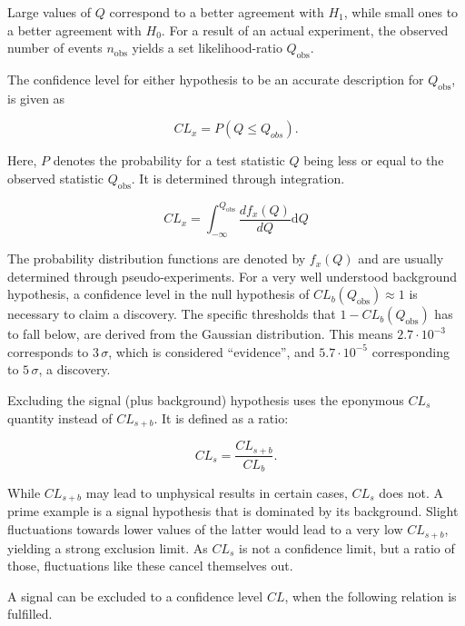 \noindent Large values of $Q$ correspond to a better agreement with $H_1$, while small ones to a better agreement with $H_0$. For a result of an actual experiment, the observed number of events $n_{\text{obs}}$ yields a set likelihood-ratio $Q_{\text{obs}}$.

The confidence level for either hypothesis to be an accurate description for $Q_{\text{obs}}$, is given as

\begin{equation}
  \label{eq:cl-prob}
  CL_x = P (Q \leq Q_{obs}).
\end{equation}

\noindent Here, $P$ denotes the probability for a test statistic $Q$ being less or equal to the observed statistic $Q_{\text{obs}}$. It is determined through integration.

\begin{equation}
  \label{eq:clx}
  CL_x = \int^{Q_{\text{obs}}}_{-\infty} \frac{d f_x(Q)}{d Q} \text{d} Q
\end{equation}

\noindent The probability distribution functions are denoted by $f_x(Q)$ and are usually determined through pseudo-experiments. For a very well understood background hypothesis, a confidence level in the null hypothesis of $CL_b (Q_{\text{obs}}) \approx 1$ is necessary to claim a discovery. The specific thresholds that $1 - CL_b (Q_{\text{obs}})$ has to fall below, are derived from the Gaussian distribution. This means $2.7 \cdot 10^{-3}$ corresponds to $3\,\sigma$, which is considered ``evidence'', and $5.7 \cdot 10^{-5}$ corresponding to $5\,\sigma$, a discovery.

Excluding the signal (plus background) hypothesis uses the eponymous $CL_s$ quantity instead of $CL_{s+b}$. It is defined as a ratio:

\begin{equation}
  \label{eq:cls}
  CL_s = \frac{CL_{s+b}}{CL_b}.
\end{equation}

\noindent While $CL_{s+b}$ may lead to unphysical results in certain cases, $CL_s$ does not. A prime example is a signal hypothesis that is dominated by its background. Slight fluctuations towards lower values of the latter would lead to a very low $CL_{s+b}$, yielding a strong exclusion limit. As $CL_s$ is not a confidence limit, but a ratio of those, fluctuations like these cancel themselves out.

A signal can be excluded to a confidence level $CL$, when the following relation is fulfilled.


